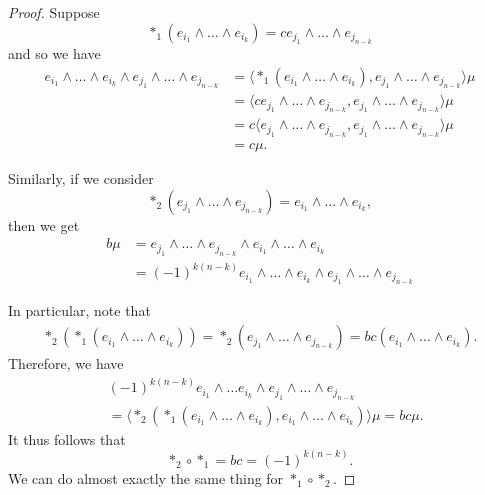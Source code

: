 \documentclass[notoc,notitlepage]{tufte-book}
\begin{document}
\begin{proof}
  Suppose
  \begin{equation*}
    *_1(e_{i_1} \land \hdots \land e_{i_k}) = c e_{j_1} \land \hdots \land
    e_{j_{n-k}}
  \end{equation*}
  and so we have
  \begin{align*}
    e_{i_1} \land \hdots \land e_{i_k} \land e_{j_1} \land \hdots \land
    e_{j_{n-k}}
    &= \langle *_1(e_{i_1} \land \hdots \land e_{i_k}), e_{j_1} \land \hdots \land
    e_{j_{n-k}}\rangle \mu \\
    &= \langle ce_{j_1} \land \hdots \land e_{j_{n-k}}, e_{j_1} \land \hdots
    \land e_{j_{n-k}} \rangle \mu \\
    &= c \langle e_{j_1} \land \hdots \land e_{j_{n-k}}, e_{j_1} \land \hdots
    \land e_{j_{n-k}} \rangle \mu \\
    &= c \mu.
  \end{align*}

  Similarly, if we consider
  \begin{equation*}
    *_2(e_{j_1} \land \hdots \land e_{j_{n-k}}) = e_{i_1} \land \hdots \land
    e_{i_k},
  \end{equation*}
  then we get
  \begin{align*}
    b \mu &= e_{j_1} \land \hdots \land e_{j_{n-k}} \land e_{i_1} \land \hdots
            \land e_{i_k} \\
          &= (-1)^{k(n-k)} e_{i_1} \land \hdots \land e_{i_k} \land e_{j_1} \land
            \hdots \land e_{j_{n-k}}
  \end{align*}

  In particular, note that
  \begin{align*}
    *_2 (*_1 (e_{i_1} \land \hdots \land e_{i_k})) = *_2 (e_{j_1} \land \hdots
    \land e_{j_{n-k}}) = bc (e_{i_1} \land \hdots \land e_{i_k}).
  \end{align*}
  Therefore, we have
  \begin{align*}
    &(-1)^{k(n-k)} e_{i_1} \land \hdots e_{i_k} \land e_{j_1} \land \hdots
    \land e_{j_{n-k}} \\
    &= \langle *_2 (*_1 (e_{i_1} \land \hdots \land e_{i_k}), e_{i_1} \land \hdots
    \land e_{i_k}) \rangle \mu
    = bc \mu.
  \end{align*}
  It thus follows that
  \begin{equation*}
    *_2 \circ *_1 = bc = (-1)^{k(n-k)}.
  \end{equation*}
  We can do almost exactly the same thing for $*_1 \circ *_2$.
\end{proof}
\end{document}
